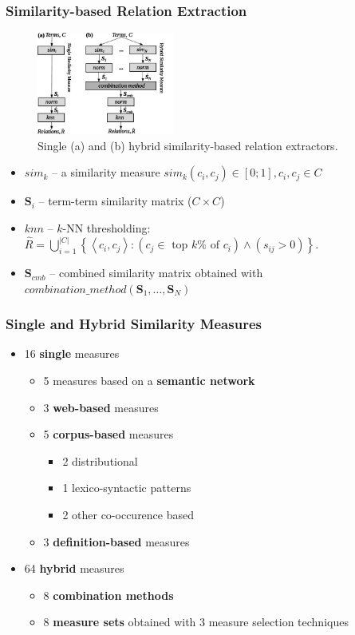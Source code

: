 \documentclass{beamer}
\begin{document}
\begin{frame}
\frametitle{Similarity-based Relation Extraction}

\begin{figure}
	\centering
		\includegraphics[width=0.40\textwidth]{figures/single-and-hybrid-2}
	\caption{Single (a) and (b) hybrid similarity-based relation extractors.}		
\end{figure}

\begin{itemize}
\item $sim_k$ -- a similarity measure $sim_k(c_i,c_j) \in [0;1], c_i,c_j \in C$
\item $\mathbf{S}_i$ -- term-term similarity matrix ($C \times C$) 

\item $knn$ -- $k$-NN thresholding:
$\hat{R}=\bigcup_{i=1}^{|C|}\left\{\left\langle c_i, c_j \right\rangle :  (c_j
\in \text{ top }k\% \text{ of } c_i) \wedge (s_{ij} > 0) \right\}.$  
\item $\mathbf{S}_{cmb}$ -- combined similarity matrix obtained with $ combination\_method(\mathbf{S}_1, \ldots,\mathbf{S}_N) $
\end{itemize}

\end{frame}

\begin{frame}
\frametitle{Single and Hybrid Similarity Measures}
\begin{itemize}
\item 16 \textbf{single} measures
	\begin{itemize}
	\item 5 measures based on a \textbf{semantic network} 
	\item 3 \textbf{web-based} measures
	\item 5 \textbf{corpus-based} measures 
	\begin{itemize}
	  \item 2 distributional
	  \item 1 lexico-syntactic patterns
	  \item 2 other co-occurence based
	\end{itemize}
	\item 3 \textbf{definition-based} measures 
\end{itemize}
\item 64 \textbf{hybrid} measures
	\begin{itemize}
	\item 8 \textbf{combination methods}
	\item 8 \textbf{measure sets} obtained with 3 measure selection techniques
	\end{itemize}
\end{itemize}

\end{frame}
\end{document}

